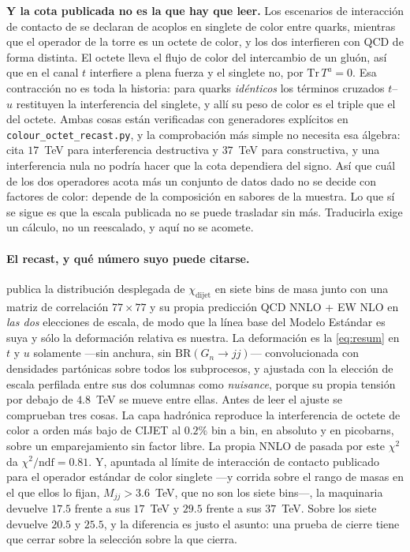 \documentclass[11pt,a4paper]{article}
\begin{document}
\noindent\textbf{Y la cota publicada no es la que hay que leer.} Los escenarios de interacción de
contacto de \cite{CMSangular} se declaran de acoplos en singlete de color entre quarks, mientras
que el operador de la torre es un octete de color, y los dos interfieren con QCD de forma
distinta. El octete lleva el flujo de color del intercambio de un gluón, así que en el canal $t$
interfiere a plena fuerza y el singlete no, por $\mathrm{Tr}\,T^a=0$. Esa contracción no es toda
la historia: para quarks \emph{idénticos} los términos cruzados $t$--$u$ restituyen la
interferencia del singlete, y allí su peso de color es el triple que el del octete. Ambas cosas
están verificadas con generadores explícitos en
\texttt{colour\_\allowbreak octet\_\allowbreak recast.py}, y la comprobación más simple no
necesita esa álgebra: \cite{CMSangular} cita $17$~TeV para interferencia destructiva y $37$~TeV
para constructiva, y una interferencia nula no podría hacer que la cota dependiera del signo. Así
que cuál de los dos operadores acota más un conjunto de datos dado no se decide con factores de
color: depende de la composición en sabores de la muestra. Lo que sí se sigue es que la escala
publicada no se puede trasladar sin más. Traducirla exige un cálculo, no un reescalado, y aquí
no se acomete.

\paragraph{El recast, y qué número suyo puede citarse.} \cite{CMSangular} publica la distribución
desplegada de $\chi_{\mathrm{dijet}}$ en siete bins de masa junto con una matriz de correlación
$77\times77$ y su propia predicción QCD NNLO + EW NLO en \emph{las dos} elecciones de escala, de
modo que la línea base del Modelo Estándar es suya y sólo la deformación relativa es nuestra. La
deformación es la \eqref{eq:resum} en $t$ y $u$ solamente ---sin anchura, sin
$\mathrm{BR}(G_n\to jj)$--- convolucionada con densidades partónicas sobre todos los subprocesos, y
ajustada con la elección de escala perfilada entre sus dos columnas como \emph{nuisance}, porque su
propia tensión por debajo de $4.8$~TeV se mueve entre ellas. Antes de leer el ajuste se comprueban
tres cosas. La capa hadrónica reproduce la interferencia de octete de color a orden más bajo de
CIJET al $0.2\%$ bin a bin, en absoluto y en picobarns, sobre un emparejamiento sin factor libre.
La propia NNLO de \cite{CMSangular} pasada por este $\chi^2$ da $\chi^2/\mathrm{ndf}=0.81$. Y,
apuntada al límite de interacción de contacto publicado para el operador estándar de color singlete
---y corrida sobre el rango de masas en el que ellos lo fijan, $M_{jj}>3.6$~TeV, que no son los
siete bins---, la maquinaria devuelve $17.5$ frente a sus $17$~TeV y $29.5$ frente a sus $37$~TeV.
Sobre los siete devuelve $20.5$ y $25.5$, y la diferencia es justo el asunto: una prueba de cierre
tiene que cerrar sobre la selección sobre la que cierra.
\end{document}
